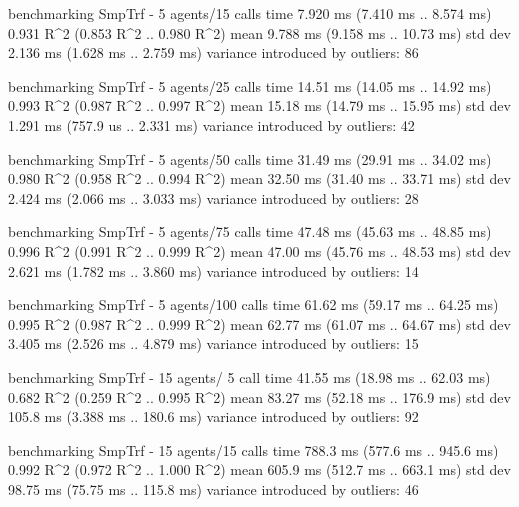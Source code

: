 \begin{showCode}
    benchmarking SmpTrf - 5 agents/15 calls
    time                 7.920 ms   (7.410 ms .. 8.574 ms)
                         0.931 R^2   (0.853 R^2 .. 0.980 R^2)
    mean                 9.788 ms   (9.158 ms .. 10.73 ms)
    std dev              2.136 ms   (1.628 ms .. 2.759 ms)
    variance introduced by outliers: 86%

    benchmarking SmpTrf - 5 agents/25 calls
    time                 14.51 ms   (14.05 ms .. 14.92 ms)
                         0.993 R^2   (0.987 R^2 .. 0.997 R^2)
    mean                 15.18 ms   (14.79 ms .. 15.95 ms)
    std dev              1.291 ms   (757.9 us .. 2.331 ms)
    variance introduced by outliers: 42%

    benchmarking SmpTrf - 5 agents/50 calls
    time                 31.49 ms   (29.91 ms .. 34.02 ms)
                         0.980 R^2   (0.958 R^2 .. 0.994 R^2)
    mean                 32.50 ms   (31.40 ms .. 33.71 ms)
    std dev              2.424 ms   (2.066 ms .. 3.033 ms)
    variance introduced by outliers: 28%

    benchmarking SmpTrf - 5 agents/75 calls
    time                 47.48 ms   (45.63 ms .. 48.85 ms)
                         0.996 R^2   (0.991 R^2 .. 0.999 R^2)
    mean                 47.00 ms   (45.76 ms .. 48.53 ms)
    std dev              2.621 ms   (1.782 ms .. 3.860 ms)
    variance introduced by outliers: 14%

    benchmarking SmpTrf - 5 agents/100 calls
    time                 61.62 ms   (59.17 ms .. 64.25 ms)
                         0.995 R^2   (0.987 R^2 .. 0.999 R^2)
    mean                 62.77 ms   (61.07 ms .. 64.67 ms)
    std dev              3.405 ms   (2.526 ms .. 4.879 ms)
    variance introduced by outliers: 15%

    benchmarking SmpTrf - 15 agents/ 5 call
    time                 41.55 ms   (18.98 ms .. 62.03 ms)
                         0.682 R^2   (0.259 R^2 .. 0.995 R^2)
    mean                 83.27 ms   (52.18 ms .. 176.9 ms)
    std dev              105.8 ms   (3.388 ms .. 180.6 ms)
    variance introduced by outliers: 92%

    benchmarking SmpTrf - 15 agents/15 calls
    time                 788.3 ms   (577.6 ms .. 945.6 ms)
                         0.992 R^2   (0.972 R^2 .. 1.000 R^2)
    mean                 605.9 ms   (512.7 ms .. 663.1 ms)
    std dev              98.75 ms   (75.75 ms .. 115.8 ms)
    variance introduced by outliers: 46%


\end{showCode}
